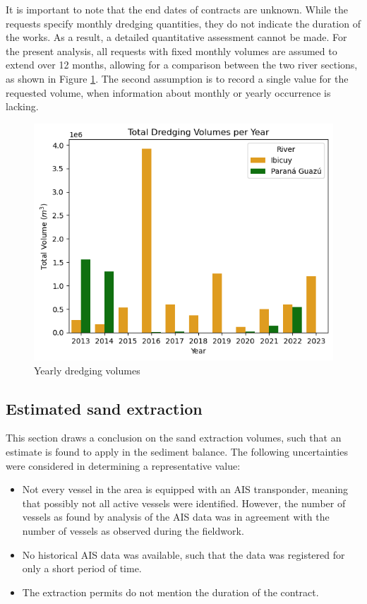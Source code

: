 It is important to note that the end dates of contracts are unknown. While the requests specify monthly dredging quantities, they do not indicate the duration of the works. As a result, a detailed quantitative assessment cannot be made. For the present analysis, all requests with fixed monthly volumes are assumed to extend over 12 months, allowing for a comparison between the two river sections, as shown in Figure \ref{fig:yearly dredging volumes}. The second assumption is to record a single value for the requested volume, when information about monthly or yearly occurrence is lacking.

\begin{figure}[H]
    \centering
    \includegraphics[width=0.50\linewidth]{figures/ch2/Dredging volumes permits.png}
    \caption{Yearly dredging volumes}
    \label{fig:yearly dredging volumes}
\end{figure}

\subsection{Estimated sand extraction}
This section draws a conclusion on the sand extraction volumes, such that an estimate is found to apply in the sediment balance. The following uncertainties were considered in determining a representative value:

\begin{itemize}
    \item Not every vessel in the area is equipped with an AIS transponder, meaning that possibly not all active vessels were identified. However, the number of vessels as found by analysis of the AIS data was in agreement with the number of vessels as observed during the fieldwork.
    \item No historical AIS data was available, such that the data was registered for only a short period of time.
    \item The extraction permits do not mention the duration of the contract.
\end{itemize}

